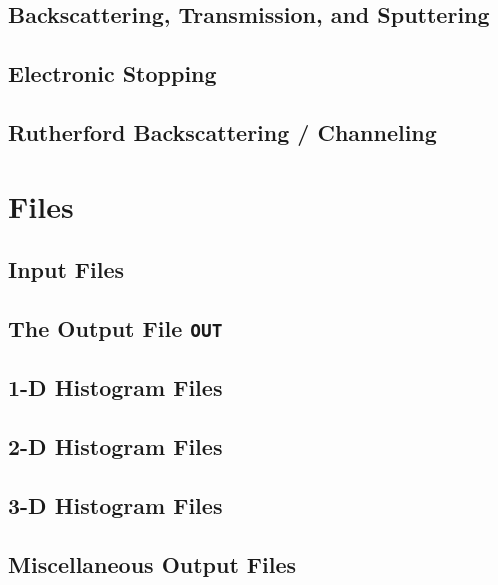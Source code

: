 \documentclass[twoside,12pt]{book}
\begin{document}
\section{Backscattering, Transmission, and Sputtering}
\label{s:sput}

%
\section{Electronic Stopping}
\label{s:stop}

%
\section{Rutherford Backscattering / Channeling}
\label{s:RBS}

%
\iffalse
\section{Deterministic damage model}
\label{s:det}

\fi
%
%
\chapter{Files}
\label{k:files}

%
\newpage    %
\section{Input Files}
\label{s:input}

%
\newpage
\section{The Output File \texttt{OUT}}
\label{s:out}

%
\newpage
\section{1-D Histogram Files}
\label{s:his1d}

%
\newpage
\section{2-D Histogram Files}
\label{s:his2d}

%
\newpage
\section{3-D Histogram Files}
\label{s:his3d}

%
\newpage
\section{Miscellaneous Output Files}
\label{s:filesmisc}

%
%
\end{document}
